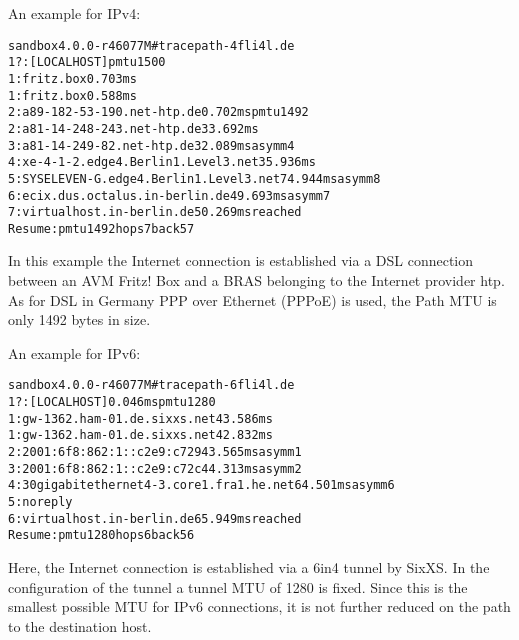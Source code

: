 \begin{description}
    An example for IPv4:
    \begin{example}
    \begin{alltt}
    sandbox 4.0.0-r46077M \# tracepath -4 fli4l.de
     1?: [LOCALHOST]                                         pmtu 1500
     1:  fritz.box                                             0.703ms 
     1:  fritz.box                                             0.588ms 
     2:  a89-182-53-190.net-htp.de                             0.702ms pmtu 1492
     2:  a81-14-248-243.net-htp.de                            33.692ms 
     3:  a81-14-249-82.net-htp.de                             32.089ms asymm  4 
     4:  xe-4-1-2.edge4.Berlin1.Level3.net                    35.936ms
     5:  SYSELEVEN-G.edge4.Berlin1.Level3.net                 74.944ms asymm  8
     6:  ecix.dus.octalus.in-berlin.de                        49.693ms asymm  7
     7:  virtualhost.in-berlin.de                             50.269ms reached
         Resume: pmtu 1492 hops 7 back 57
    \end{alltt}
    \end{example}
    In this example the Internet connection is established via a DSL connection between
    an AVM Fritz! Box and a BRAS belonging to the Internet provider htp. As for DSL in
    Germany PPP over Ethernet (PPPoE) is used, the Path MTU is only 1492 bytes in size.
    
    An example for IPv6:
    \begin{example}
    \begin{alltt}
    sandbox 4.0.0-r46077M \# tracepath -6 fli4l.de
     1?: [LOCALHOST]                        0.046ms pmtu 1280
     1:  gw-1362.ham-01.de.sixxs.net                          43.586ms
     1:  gw-1362.ham-01.de.sixxs.net                          42.832ms
     2:  2001:6f8:862:1::c2e9:c729                            43.565ms asymm  1
     3:  2001:6f8:862:1::c2e9:c72c                            44.313ms asymm  2
     4:  30gigabitethernet4-3.core1.fra1.he.net               64.501ms asymm  6
     5:  no reply
     6:  virtualhost.in-berlin.de                             65.949ms reached
         Resume: pmtu 1280 hops 6 back 56
    \end{alltt}
    \end{example}
    Here, the Internet connection is established via a 6in4 tunnel by SixXS.
    In the configuration of the tunnel a tunnel MTU of 1280 is fixed. Since this is
    the smallest possible MTU for IPv6 connections, it is not further reduced on
    the path to the destination host.


\end{description}
